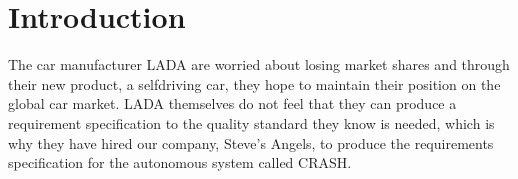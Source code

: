 \documentclass{article}
\begin{document}

\titleformat{\subsubsection}[runin]{\large\bfseries}{}{0pt}{#1\quad\thesubsubsection}


\begingroup
\hypersetup{linkcolor=black}
\tableofcontents
\thispagestyle{empty}
\endgroup
\newpage
\begingroup
\hypersetup{linkcolor=black}
\listoffigures
\thispagestyle{empty}
\endgroup
\newpage
{}

\section{Introduction}
The car manufacturer LADA are worried about losing market shares and through their new product, a selfdriving car, they hope to maintain their position on the global car market. LADA themselves do not feel that they can produce a requirement specification to the quality standard they know is needed, which is why they have hired our company, Steve's Angels, to produce the requirements specification for the autonomous system called CRASH. 
\end{document}
